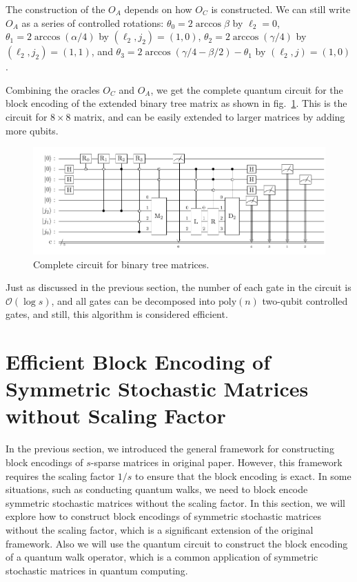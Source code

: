 \documentclass{article}
\begin{document}
The construction of the $O_A$ depends on how $O_C$ is constructed. We can still write $O_A$ as a series of controlled rotations: $\theta_0 = 2\arccos \beta$ by $\ell_2 =0$, $\theta_1 = 2\arccos (\alpha/ 4)$ by $(\ell_2, j_2) = (1,0)$, $\theta_2 = 2\arccos (\gamma/ 4)$ by $(\ell_2, j_2) = (1,1)$, and $\theta_3 = 2\arccos (\gamma/ 4 - \beta/2) - \theta_1$ by $(\ell_2, j) = (1,0)$.

Combining the oracles $O_C$ and $O_A$, we get the complete quantum circuit for the block encoding of the extended binary tree matrix as shown in fig.~\ref{fig:tree_circuit}. This is the circuit for $8\times 8$ matrix, and can be easily extended to larger matrices by adding more qubits.

\begin{figure}[htbp]
  \centering
  \includegraphics{pdf/tree_circuit}
  \caption{Complete circuit for binary tree matrices.}
  \label{fig:tree_circuit}
\end{figure}

Just as discussed in the previous section, the number of each gate in the circuit is $\mathcal{O}(\log s)$, and all gates can be decomposed into $\mathrm{poly}(n)$ two-qubit controlled gates, and still, this algorithm is considered efficient.

\section{Efficient Block Encoding of Symmetric Stochastic Matrices without Scaling Factor}\label{sec:efficient-block-encoding-of-symmetric-stochastic-matrices-without-scaling-factor}
In the previous section, we introduced the general framework for constructing block encodings of $s$-sparse matrices in original paper.
However, this framework requires the scaling factor $1/s$ to ensure that the block encoding is exact.
In some situations, such as conducting quantum walks, we need to block encode symmetric stochastic matrices without the scaling factor.
In this section, we will explore how to construct block encodings of symmetric stochastic matrices without the scaling factor, which is a significant extension of the original framework.
Also we will use the quantum circuit to construct the block encoding of a quantum walk operator, which is a common application of symmetric stochastic matrices in quantum computing.
\end{document}
